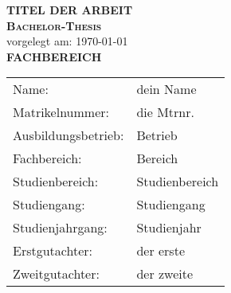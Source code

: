 \begin{titlepage}
    \begin{center}
    \huge \textbf{\textsf{TITEL DER ARBEIT}} \\
    \vspace{2cm}
    \LARGE\textbf{\textsc{Bachelor-Thesis}}\\
    \vspace{1cm}
    \normalsize
    vorgelegt am: \today \\
    \vspace{2.5cm}
    \large \textbf{FACHBEREICH}\\
    \vspace{3cm}
    \end{center}
 \normalsize{
    \begin{tabular}{ll}
    	Name: & {dein Name} \\
    	Matrikelnummer: & {die Mtrnr.} \\
    	Ausbildungsbetrieb: & {Betrieb}\\
    	Fachbereich: & {Bereich}\\
    	Studienbereich: & {Studienbereich}\\
    	Studiengang: & {Studiengang}\\
    	Studienjahrgang: & {Studienjahr}\\
      Erstgutachter: & {der erste} \\
      Zweitgutachter: & {der zweite} \\
    \end{tabular}\\
    }
\end{titlepage}
